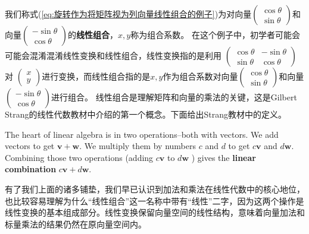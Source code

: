 我们称式(\ref{eq:旋转作为将矩阵视为列向量线性组合的例子})为对向量$\left(\begin{array}{c}
\cos \theta \\
\sin \theta
\end{array}\right)$和向量$\left(\begin{array}{c}
-\sin \theta \\
\cos \theta
\end{array}\right)$的\textcolor{third}{\bf 线性组合}，$x,y$称为组合系数。
在这个例子中，初学者可能会可能会混淆混淆线性变换和线性组合，线性变换指的是利用
$\left(\begin{array}{cc}
\cos \theta & -\sin \theta \\
\sin \theta & \cos \theta
\end{array}\right)$对
$\left(\begin{array}{c}
x \\
y
\end{array}\right)$进行变换，而线性组合指的是$x,y$作为组合系数对向量$\left(\begin{array}{c}
\cos \theta \\
\sin \theta
\end{array}\right)$和向量$\left(\begin{array}{c}
-\sin \theta \\
\cos \theta
\end{array}\right)$进行组合。
线性组合是理解矩阵和向量的乘法的关键，这是Gilbert Strang的线性代数教材中介绍的第一个概念。下面给出Strang教材中的定义。
\begin{definition}[线性组合]
    The heart of linear algebra is in two operations--both with vectors. We add vectors to get $\boldsymbol{v}+\boldsymbol{w}$. We multiply them by numbers $c$ and $d$ to get $c \boldsymbol{v}$ and $d \boldsymbol{w}$. Combining those two operations (adding $c \boldsymbol{v}$ to $d \boldsymbol{w}$ ) gives the \textcolor{third}{\bf linear combination} $c \boldsymbol{v}+d \boldsymbol{w}$.
\end{definition}

有了我们上面的诸多铺垫，我们早已认识到加法和乘法在线性代数中的核心地位，也比较容易理解为什么“线性组合”这一名称中带有“线性”二字，因为这两个操作是线性变换的基本组成部分。线性变换保留向量空间的线性结构，意味着向量加法和标量乘法的结果仍然在原向量空间内。

